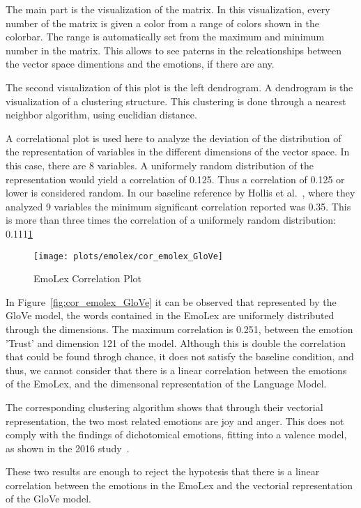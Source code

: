 The main part is the visualization of the matrix. In this visualization, every number of the matrix is given a color from a range of colors shown in the colorbar. The range is automatically set from the maximum and minimum number in the matrix. This allows to see paterns in the releationships between the vector space dimentions and the emotions, if there are any.

The second visualization of this plot is the left dendrogram. A dendrogram is the visualization of a clustering structure. This clustering is done through a nearest neighbor algorithm, using euclidian distance.

A correlational plot is used here to analyze the deviation of the distribution of the representation of variables in the different dimensions of the vector space. In this case, there are 8 variables. A uniformely random distribution of the representation would yield a correlation of 0.125. Thus a correlation of  0.125 or lower is considered random. In our baseline reference by Hollis et al.~\cite{hollis2016principals}, where they analyzed 9 variables the minimum significant correlation reported was 0.35. This is more than three times the correlation of a uniformely random distribution: 0.111\underline{1}

\begin{figure}[H]
  \texttt{[image: plots/emolex/cor\_emolex\_GloVe]}
  \centering
  \caption{EmoLex Correlation Plot}
\end{figure}\label{fig:cor_emolex_GloVe}

In Figure~\ref{fig:cor_emolex_GloVe} it can be observed that represented by the GloVe model, the words contained in the EmoLex are uniformely distributed through the dimensions. The maximum correlation is 0.251, between the emotion 'Trust' and dimension 121 of the model. Although this is double the correlation that could be found throgh chance, it does not satisfy the baseline condition, and thus, we cannot consider that there is a linear correlation between the emotions of the EmoLex, and the dimensonal representation of the Language Model.

The corresponding clustering algorithm shows that through their vectorial representation, the two most related emotions are joy and anger. This does not comply with the findings of dichotomical emotions, fitting into a valence model, as shown in the 2016 study~\cite{barradas2016thesis}.

These two results are enough to reject the hypotesis that there is a linear correlation between the emotions in the EmoLex and the vectorial representation of the GloVe model.


